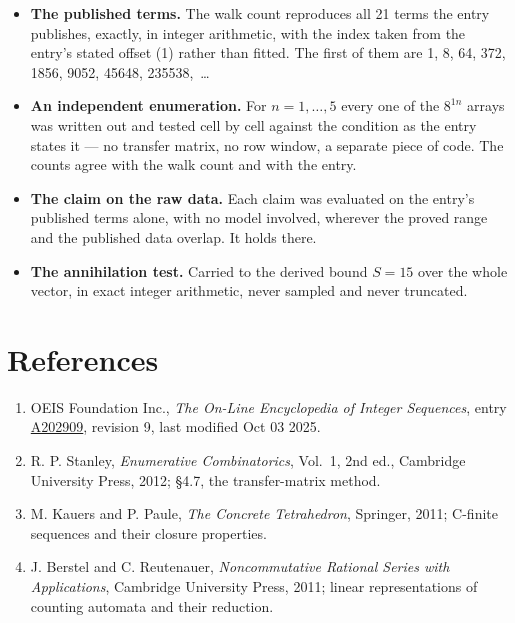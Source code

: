 \documentclass[11pt]{article}
\theoremstyle{definition}
\begin{document}
\begin{itemize}

\item {\bfseries The published terms.} The walk count reproduces all 21 terms the entry publishes, exactly, in integer arithmetic, with the index taken from the entry's stated offset (1) rather than fitted. The first of them are 1, 8, 64, 372, 1856, 9052, 45648, 235538,~\dots

\item {\bfseries An independent enumeration.} For $n = 1,\dots,5$ every one of the $8^{1n}$ arrays was written out and tested cell by cell against the condition as the entry states it --- no transfer matrix, no row window, a separate piece of code. The counts agree with the walk count and with the entry.

\item {\bfseries The claim on the raw data.} Each claim was evaluated on the entry's published terms alone, with no model involved, wherever the proved range and the published data overlap. It holds there.

\item {\bfseries The annihilation test.} Carried to the derived bound $S = 15$ over the whole vector, in exact integer arithmetic, never sampled and never truncated.

\end{itemize}

\section{References}

\begin{enumerate}

\item OEIS Foundation Inc., \emph{The On-Line Encyclopedia of Integer Sequences}, entry \href{https://oeis.org/A202909}{A202909}, revision 9, last modified Oct 03 2025.

\item R. P. Stanley, \emph{Enumerative Combinatorics}, Vol.~1, 2nd ed., Cambridge University Press, 2012; \S4.7, the transfer-matrix method.

\item M. Kauers and P. Paule, \emph{The Concrete Tetrahedron}, Springer, 2011; C-finite sequences and their closure properties.

\item J. Berstel and C. Reutenauer, \emph{Noncommutative Rational Series with Applications}, Cambridge University Press, 2011; linear representations of counting automata and their reduction.

\end{enumerate}
\end{document}
